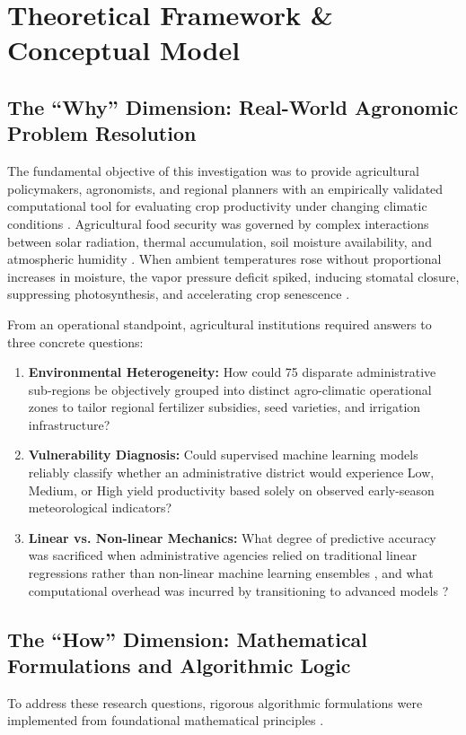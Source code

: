 \documentclass[conference]{IEEEtran}
\begin{document}
\section{Theoretical Framework \& Conceptual Model}

\subsection{The ``Why'' Dimension: Real-World Agronomic Problem Resolution}
The fundamental objective of this investigation was to provide agricultural policymakers, agronomists, and regional planners with an empirically validated computational tool for evaluating crop productivity under changing climatic conditions \cite{dhakal2023, crane2018, lobell2008}. Agricultural food security was governed by complex interactions between solar radiation, thermal accumulation, soil moisture availability, and atmospheric humidity \cite{demartonne1926, schlenker2009}. When ambient temperatures rose without proportional increases in moisture, the vapor pressure deficit spiked, inducing stomatal closure, suppressing photosynthesis, and accelerating crop senescence \cite{schlenker2009}.

From an operational standpoint, agricultural institutions required answers to three concrete questions:
\begin{enumerate}
    \item \textbf{Environmental Heterogeneity:} How could 75 disparate administrative sub-regions be objectively grouped into distinct agro-climatic operational zones \cite{macqueen1967, rousseeuw1987} to tailor regional fertilizer subsidies, seed varieties, and irrigation infrastructure?
    \item \textbf{Vulnerability Diagnosis:} Could supervised machine learning models \cite{breiman2001, cortes1995, quinlan1986} reliably classify whether an administrative district would experience Low, Medium, or High yield productivity based solely on observed early-season meteorological indicators?
    \item \textbf{Linear vs. Non-linear Mechanics:} What degree of predictive accuracy was sacrificed when administrative agencies relied on traditional linear regressions \cite{hoerl1970} rather than non-linear machine learning ensembles \cite{breiman2001}, and what computational overhead was incurred by transitioning to advanced models \cite{hastie2009}?
\end{enumerate}

\subsection{The ``How'' Dimension: Mathematical Formulations and Algorithmic Logic}
To address these research questions, rigorous algorithmic formulations were implemented from foundational mathematical principles \cite{hastie2009}.
\end{document}

